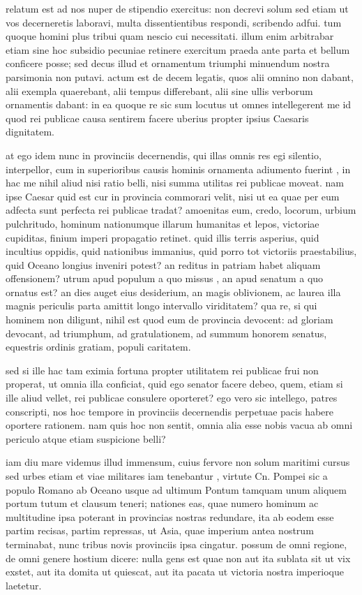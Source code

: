  relatum est ad nos nuper de stipendio exercitus: non decrevi solum sed etiam ut vos decerneretis laboravi, multa dissentientibus respondi, scribendo adfui. tum quoque homini plus tribui quam nescio cui necessitati. illum enim arbitrabar etiam sine hoc subsidio pecuniae retinere exercitum praeda ante parta et bellum conficere posse; sed decus illud et ornamentum triumphi minuendum nostra parsimonia non putavi. actum est de decem legatis, quos alii omnino non dabant, alii exempla quaerebant, alii tempus differebant, alii sine ullis verborum ornamentis dabant: in ea quoque re sic sum locutus ut omnes intellegerent me id quod rei publicae causa sentirem facere uberius propter ipsius Caesaris dignitatem.

 at ego idem nunc in provinciis decernendis, qui illas omnis res egi silentio, interpellor, cum in superioribus causis hominis ornamenta adiumento fuerint , in hac me nihil aliud nisi ratio belli, nisi summa utilitas rei publicae moveat. nam ipse Caesar quid est cur in provincia commorari velit, nisi ut ea quae per eum adfecta sunt perfecta rei publicae tradat? amoenitas eum, credo, locorum, urbium pulchritudo, hominum nationumque illarum humanitas et lepos, victoriae cupiditas, finium imperi propagatio retinet. quid illis terris asperius, quid incultius oppidis, quid nationibus immanius, quid porro tot victoriis praestabilius, quid Oceano longius inveniri potest? an reditus in patriam habet aliquam offensionem? utrum apud populum a quo missus , an apud senatum a quo ornatus est? an dies auget eius desiderium, an magis oblivionem, ac laurea illa magnis periculis parta amittit longo intervallo viriditatem? qua re, si qui hominem non diligunt, nihil est quod eum de provincia devocent: ad gloriam devocant, ad triumphum, ad gratulationem, ad summum honorem senatus, equestris ordinis gratiam, populi caritatem.

 sed si ille hac tam eximia fortuna propter utilitatem rei publicae frui non properat, ut omnia illa conficiat, quid ego senator facere debeo, quem, etiam si ille aliud vellet, rei publicae consulere oporteret? ego vero sic intellego, patres conscripti, nos hoc tempore in provinciis decernendis perpetuae pacis habere oportere rationem. nam quis hoc non sentit, omnia alia esse nobis vacua ab omni periculo atque etiam suspicione belli?

 iam diu mare videmus illud immensum, cuius fervore non solum maritimi cursus sed urbes etiam et viae militares iam tenebantur , virtute Cn. Pompei sic a populo Romano ab Oceano usque ad ultimum Pontum tamquam unum aliquem portum tutum et clausum teneri; nationes eas, quae numero hominum ac multitudine ipsa poterant in provincias nostras redundare, ita ab eodem esse partim recisas, partim repressas, ut Asia, quae imperium antea nostrum terminabat, nunc tribus novis provinciis ipsa cingatur. possum de omni regione, de omni genere hostium dicere: nulla gens est quae non aut ita sublata sit ut vix exstet, aut ita domita ut quiescat, aut ita pacata ut victoria nostra imperioque laetetur.

